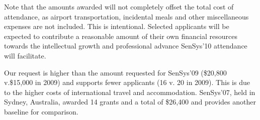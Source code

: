 Note that the amounts awarded will not completely offset the total cost of
attendance, as airport transportation, incidental meals and other
miscellaneous expenses are not included. This is intentional. Selected
applicants will be expected to contribute a reasonable amount of their own
financial resources towards the intellectual growth and professional advance
SenSys'10 attendance will facilitate.

Our request is higher than the amount requested for SenSys'09 (\$20,800
v.\$15,000 in 2009) and supports fewer applicants (16 v. 20 in 2009). This is
due to the higher costs of international travel and accommodation. SenSys'07,
held in Sydney, Australia, awarded 14 grants and a total of \$26,400 and
provides another baseline for comparison.
